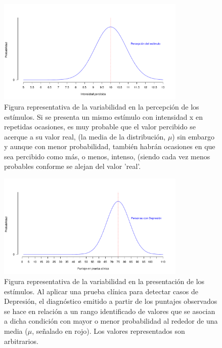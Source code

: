 \begin{figure}[th]
\centering
\includegraphics[width=0.80\textwidth]{Figures/Signal_Perception} 
\caption[Variabilidad en la percepción de los estímulos]{Figura representativa de la variabilidad en la percepción de los estímulos. Si se presenta un mismo estímulo con intensidad x en repetidas ocasiones, es muy probable que el valor percibido se acerque a su valor real, (la media de la distribución, $\mu$) sin embargo y aunque con menor probabilidad, también habrán ocasiones en que sea percibido como más, o menos, intenso, (siendo cada vez menos probables conforme se alejan del valor 'real'.}
\label{fig:Senal_percepcion}
\end{figure}


\begin{figure}[th]
\centering
\includegraphics[width=0.80\textwidth]{Figures/Signal_Presentation} 
\caption[Variabilidad en la presentación de los estímulos]{Figura representativa de la variabilidad en la presentación de los estímulos. Al aplicar una prueba clínica para detectar casos de Depresión, el diagnóstico emitido a partir de los puntajes observados se hace en relación a un rango identificado de valores que se asocian a dicha condición con mayor o menor probabilidad al rededor de una media ($\mu$, señalado en rojo). Los valores representados son arbitrarios.}
\label{fig:Senal_presentacion}
\end{figure}


